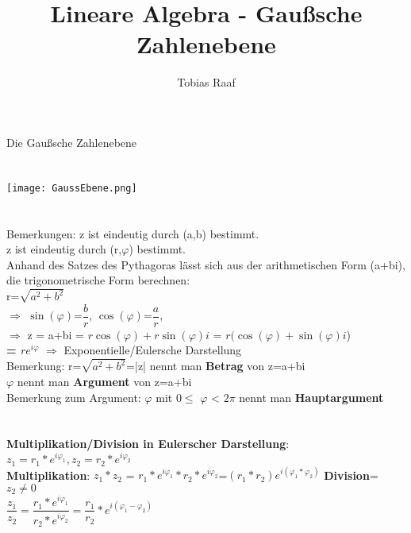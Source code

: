\documentclass{scrartcl}
\title{Lineare Algebra - Gaußsche Zahlenebene}
\author{Tobias Raaf}
\begin{document}
	\Large Die Gaußsche Zahlenebene \\\\\\
	\normalsize
\texttt{[image: GaussEbene.png]}\\\\\\
Bemerkungen: z ist eindeutig durch (a,b) bestimmt.\\
\hspace*{68pt} z ist eindeutig durch (r,$\varphi$) bestimmt.\\
Anhand des Satzes des Pythagoras lässt sich aus der arithmetischen Form (a+bi), die trigonometrische Form berechnen:\\
r=$\sqrt{a^2+b^2}$\\
$\Rightarrow$ $\sin(\varphi)$=$\dfrac{b}{r}$, $\cos(\varphi)$=$\dfrac{a}{r}$, \\
$\Rightarrow$ z = a+bi = $r\cos(\varphi)+r\sin(\varphi)i$ = $r(\cos(\varphi)+\sin(\varphi)i$)\\\Large
\textbf{= $re^{i\varphi}$} $\Rightarrow$ Exponentielle/Eulersche Darstellung\\\normalsize
Bemerkung: r=$\sqrt{a^2+b^2}$=|z| nennt man \textbf{Betrag} von z=a+bi\\
\hspace*{56pt} $\varphi$ nennt man \textbf{Argument} von z=a+bi\\
Bemerkung zum Argument: $\varphi$ mit 0$\leq$ $\varphi$ < $2\pi$ nennt man \textbf{Hauptargument}\\
\\\\
\textbf{Multiplikation/Division in Eulerscher Darstellung}:\\
$z_1=r_1*e^{i\varphi_1},z_2=r_2*e^{i\varphi_2}$\\
\textbf{Multiplikation}: $z_1*z_2$ = $r_1*e^{i\varphi_1}*r_2*e^{i\varphi_2}$=$(r_1*r_2)e^{i(\varphi_1*\varphi_2)}$
\textbf{Division}= $z_2\neq0$\\
$\dfrac{z_1}{z_2}=\dfrac{r_1*e^{i\varphi_1}}{r_2*e^{i\varphi_2}}= \dfrac{r_1}{r_2}*e^{i(\varphi_1-\varphi_2)}$ 
\end{document}
